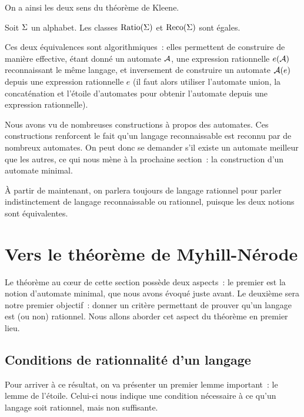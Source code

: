 \noindent
On a ainsi les deux sens du théorème de Kleene.

\begin{theorem}
  Soit $\Sigma$ un alphabet. Les classes $\operatorname{Ratio}(\Sigma)$ et $\operatorname{Reco}(\Sigma)$ sont
  égales.
\end{theorem}

\begin{remark}
  Ces deux équivalences sont algorithmiques~: elles permettent de construire
  de manière effective, étant donné un automate $\mathcal{A}$, une expression
  rationnelle $e(\mathcal{A})$ reconnaissant le même langage, et inversement de
  construire un automate $\mathcal{A}(e)$ depuis une expression rationnelle $e$
  (il faut alors utiliser l'automate union, la concaténation et l'étoile
  d'automates pour obtenir l'automate depuis une expression rationnelle).
\end{remark}

Nous avons vu de nombreuses constructions à propos des automates. Ces
constructions renforcent le fait qu'un langage reconnaissable est reconnu par de
nombreux automates. On peut donc se demander s'il existe un automate meilleur
que les autres, ce qui nous mène à la prochaine section~: la construction d'un
automate minimal.

\`A partir de maintenant, on parlera toujours de langage rationnel pour parler
indistinctement de langage reconnaissable ou rationnel, puisque les deux notions
sont équivalentes.

\section{Vers le théorème de Myhill-Nérode}

Le théorème au c\oe ur de cette section possède deux aspects~: le premier est
la notion d'automate minimal, que nous avons évoqué juste avant. Le deuxième
sera notre premier objectif~: donner un critère permettant de prouver qu'un
langage est (ou non) rationnel. Nous allons aborder cet aspect du théorème en
premier lieu.

\subsection{Conditions de rationnalité d'un langage}

Pour arriver à ce résultat, on va présenter un premier lemme important~: le
lemme de l'étoile. Celui-ci nous indique une condition nécessaire à ce qu'un
langage soit rationnel, mais non suffisante.

